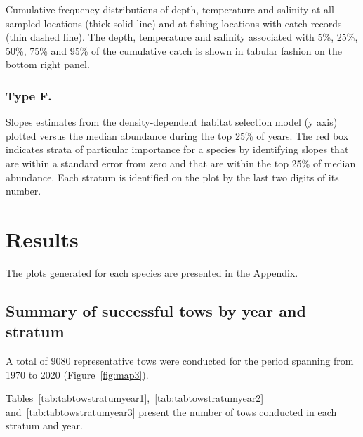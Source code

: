 \documentclass[12pt]{article}\usepackage[]{graphicx}\usepackage[]{color}
\begin{document}
Cumulative frequency distributions of depth, temperature and salinity at all sampled locations (thick solid line) and at fishing locations with catch records (thin dashed line). The depth, temperature and salinity associated with 5\%, 25\%, 50\%, 75\% and 95\% of the cumulative catch is shown in tabular fashion on the bottom right panel.

\hypertarget{type-f.}{%
\subsubsection{Type F.}\label{type-f.}}

Slopes estimates from the density-dependent habitat selection model (y axis) plotted versus the median abundance during the top 25\% of years. The red box indicates strata of particular importance for a species by identifying slopes that are within a standard error from zero and that are within the top 25\% of median abundance. Each stratum is identified on the plot by the last two digits of its number.

\hypertarget{results}{%
\section{Results}\label{results}}

The plots generated for each species are presented in the Appendix.

\hypertarget{summary-of-successful-tows-by-year-and-stratum}{%
\subsection{Summary of successful tows by year and stratum}\label{summary-of-successful-tows-by-year-and-stratum}}

A total of 9080 representative tows were conducted for the period spanning from 1970 to 2020 (Figure~\ref{fig:map3}).

Tables~\ref{tab:tabtowstratumyear1},~\ref{tab:tabtowstratumyear2} and~\ref{tab:tabtowstratumyear3} present the number of tows conducted in each stratum and year.
\end{document}
